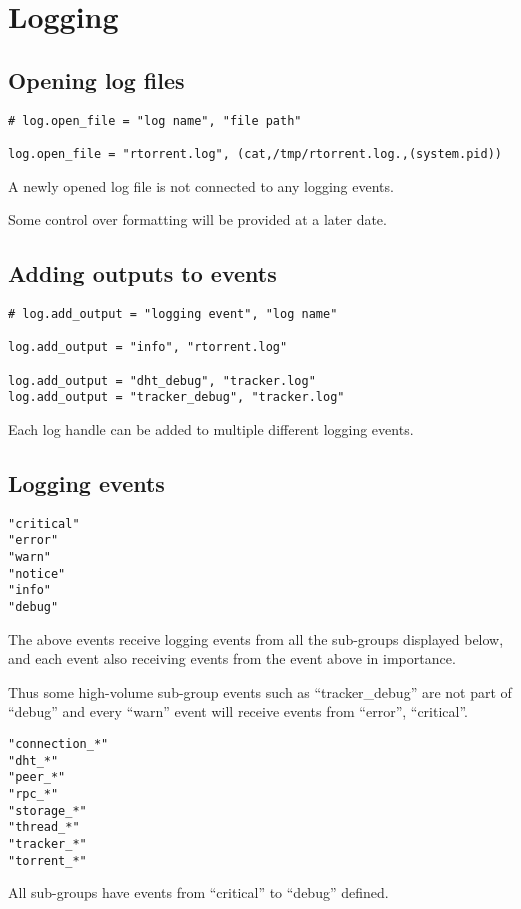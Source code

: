 \section{Logging}

\subsection{Opening log files}

\begin{verbatim}
# log.open_file = "log name", "file path"

log.open_file = "rtorrent.log", (cat,/tmp/rtorrent.log.,(system.pid))  
\end{verbatim}

A newly opened log file is not connected to any logging events.

Some control over formatting will be provided at a later date.


\subsection{Adding outputs to events}

\begin{verbatim}
# log.add_output = "logging event", "log name"

log.add_output = "info", "rtorrent.log"

log.add_output = "dht_debug", "tracker.log"
log.add_output = "tracker_debug", "tracker.log"
\end{verbatim}

Each log handle can be added to multiple different logging events.


\subsection{Logging events}

\begin{verbatim}
"critical"
"error"
"warn"
"notice"
"info"
"debug"
\end{verbatim}

The above events receive logging events from all the sub-groups
displayed below, and each event also receiving events from the event
above in importance.

Thus some high-volume sub-group events such as ``tracker\_debug'' are
not part of ``debug'' and every ``warn'' event will receive events
from ``error'', ``critical''.

\begin{verbatim}
"connection_*"
"dht_*"
"peer_*"
"rpc_*"
"storage_*"
"thread_*"
"tracker_*"
"torrent_*"
\end{verbatim}

All sub-groups have events from ``critical'' to ``debug'' defined.


